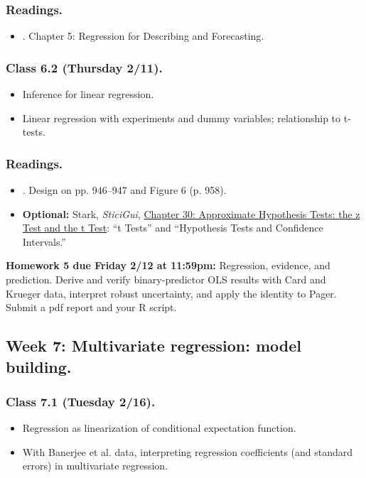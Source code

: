 \documentclass[letterpaper, 12pt, parskip=full,DIV=10]{scrartcl}
\begin{document}
\subsubsection*{Readings.}
\begin{itemize}
\item {}. Chapter 5: Regression for Describing and Forecasting.
\end{itemize}

\subsubsection*{Class 6.2 (Thursday 2/11).}
\begin{itemize}
\item Inference for linear regression.
\item Linear regression with experiments and dummy variables; relationship to t-tests.
\end{itemize}

\subsubsection*{Readings.}
\begin{itemize}
\item {}. Design on pp. 946--947 and Figure 6 (p. 958).
\item \textbf{Optional:} Stark, \textit{SticiGui}, \href{https://www.stat.berkeley.edu/~stark/SticiGui/Text/zTest.htm}{Chapter 30: Approximate Hypothesis Tests: the z Test and the t Test}: ``t Tests'' and ``Hypothesis Tests and Confidence Intervals.''
\end{itemize}

\textbf{Homework 5 due Friday 2/12 at 11:59pm:}
Regression, evidence, and prediction. Derive and verify binary-predictor OLS results with Card and Krueger data, interpret robust uncertainty, and apply the identity to Pager. Submit a pdf report and your R script.

\subsection*{Week 7: Multivariate regression: model building.}
\subsubsection*{Class 7.1 (Tuesday 2/16).}
\begin{itemize}
\item Regression as linearization of conditional expectation function.
\item With Banerjee et al. data, interpreting regression coefficients (and standard errors) in multivariate regression.
\end{itemize}
\end{document}
